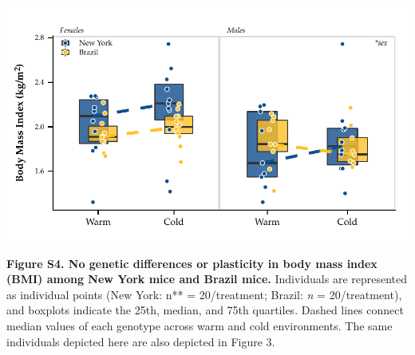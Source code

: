 \documentclass[
]{article}
\begin{document}
\newpage

\includegraphics{../results/figures/RXNs_BMI.pdf}

\textbf{Figure S4. No genetic differences or plasticity in body mass
index (BMI) among New York mice and Brazil mice.} Individuals are
represented as individual points (New York: n** = 20/treatment; Brazil:
\emph{n} = 20/treatment), and boxplots indicate the 25th, median, and
75th quartiles. Dashed lines connect median values of each genotype
across warm and cold environments. The same individuals depicted here
are also depicted in Figure 3.
\end{document}
